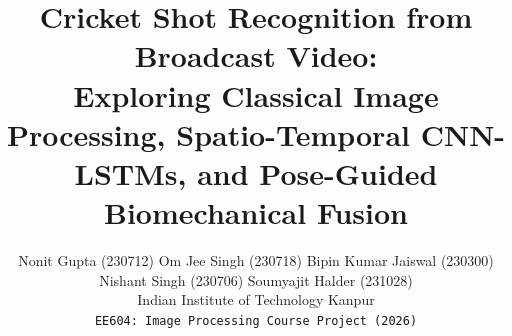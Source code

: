 \documentclass[10pt,twocolumn,letterpaper]{article}
\title{Cricket Shot Recognition from Broadcast Video:\\Exploring Classical Image Processing, Spatio-Temporal CNN-LSTMs, and Pose-Guided Biomechanical Fusion}
\author{
Nonit Gupta (230712) \quad Om Jee Singh (230718) \quad Bipin Kumar Jaiswal (230300)\\
Nishant Singh (230706) \quad Soumyajit Halder (231028)\\[3pt]
Indian Institute of Technology Kanpur\\
{\tt\small EE604: Image Processing Course Project (2026)}
}
\begin{document}
\maketitle






{
    \small
    
    
}


\end{document}
